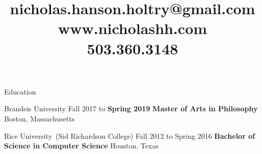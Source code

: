 \documentclass{resume}
\title{%
nicholas.hanson.holtry@gmail.com \\
www.nicholashh.com \\
503.360.3148}
\begin{document}
\begin{rSection}{Education}

  \begin{rSubSection}
  {Brandeis \normalfont University}
  {Fall 2017 to \bf Spring 2019}
  {\bf Master \normalfont of Arts in \bf Philosophy}
  {Boston, Massachusetts}%
  \iftoggle{cv}{
    \item Thesis:~``Reasoning First Rationality''
    \item Advisors:~Dr.~Berislav Maru{\v s}i{\' c}, Dr.~Eli Hirsch
    \item Philosophy GPA:~\tab{$4.00/4.00$}
    \item Overall GPA:~\tab{$3.96/4.00$}
  }{
    \item GPA:~$3.93/4.00$
  }
  \end{rSubSection}

  \begin{rSubSection}
  {Rice \normalfont University~(Sid Richardson College)}
  {Fall 2012 to Spring 2016}
  {\bf Bachelor \normalfont of Science in \bf Computer Science}
  {Houston, Texas}%
  \iftoggle{cv}{
    \item Comp Sci GPA:~\tab{$3.68/4.00$}
    \item Overall GPA:~\tab{$3.61/4.00$}
  }{
    \item GPA:~$3.61/4.00$
  }
  \end{rSubSection}










\end{rSection}
\end{document}
